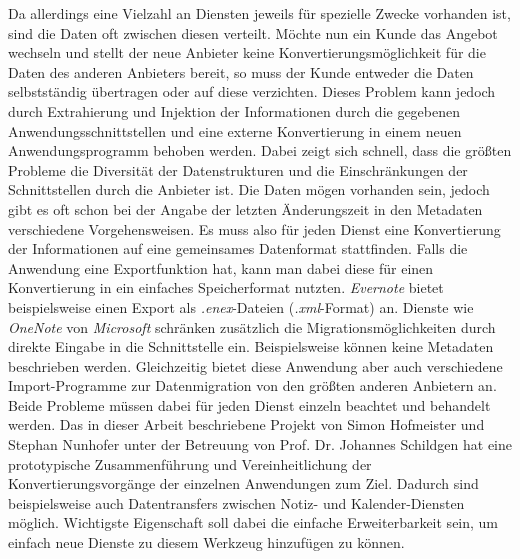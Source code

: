 Da allerdings eine Vielzahl an Diensten jeweils für spezielle Zwecke vorhanden ist, sind die Daten oft zwischen diesen verteilt. Möchte nun ein Kunde das Angebot wechseln und stellt der neue Anbieter keine Konvertierungsmöglichkeit für die Daten des anderen Anbieters bereit, so muss der Kunde entweder die Daten selbstständig übertragen oder auf diese verzichten. Dieses Problem kann jedoch durch Extrahierung und Injektion der Informationen durch die gegebenen Anwendungsschnittstellen und eine externe Konvertierung in einem neuen Anwendungsprogramm behoben werden. Dabei zeigt sich schnell, dass die größten Probleme die Diversität der Datenstrukturen und die Einschränkungen der Schnittstellen durch die Anbieter ist. Die Daten mögen vorhanden sein, jedoch gibt es oft schon bei der Angabe der letzten Änderungszeit in den Metadaten verschiedene Vorgehensweisen. Es muss also für jeden Dienst eine Konvertierung der Informationen auf eine gemeinsames Datenformat stattfinden. Falls die Anwendung eine Exportfunktion hat, kann man dabei diese für einen Konvertierung in ein einfaches Speicherformat nutzten. \textit{Evernote} bietet beispielsweise einen Export als \textit{.enex}-Dateien (\textit{.xml}-Format) an. Dienste wie \textit{OneNote} von \textit{Microsoft} schränken zusätzlich die Migrationsmöglichkeiten durch direkte Eingabe in die Schnittstelle ein. Beispielsweise können keine Metadaten beschrieben werden. Gleichzeitig bietet diese Anwendung aber auch verschiedene Import-Programme zur Datenmigration von den größten anderen Anbietern an. Beide Probleme müssen dabei für jeden Dienst einzeln beachtet und behandelt werden. Das in dieser Arbeit beschriebene Projekt von Simon Hofmeister und Stephan Nunhofer unter der Betreuung von Prof. Dr. Johannes Schildgen hat eine prototypische Zusammenführung und Vereinheitlichung der Konvertierungsvorgänge der einzelnen Anwendungen zum Ziel. Dadurch sind beispielsweise auch Datentransfers zwischen Notiz- und Kalender-Diensten möglich. Wichtigste Eigenschaft soll dabei die einfache Erweiterbarkeit sein, um einfach neue Dienste zu diesem Werkzeug hinzufügen zu können. 